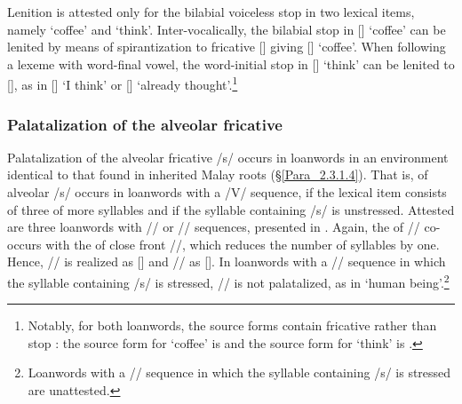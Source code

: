 Lenition is attested only for the bilabial voiceless stop in two lexical items, namely  ‘coffee’ and  ‘think’. Inter-vocalically, the bilabial stop in  [] ‘coffee’ can be lenited by means of spirantization to fricative [] giving [] ‘coffee’. When following a lexeme with word-final vowel, the word-initial stop in  [] ‘think’ can be lenited to [], as in []  ‘I think’ or []  ‘already thought’.\footnote{Notably, for both loanwords, the source forms contain fricative  rather than stop : the source form for  ‘coffee’ is   and the source form for  ‘think’ is  .}


\subsubsection[Palatalization of the alveolar fricative]{Palatalization of the alveolar fricative\label{Para_2.5.2.3}}

Palatalization of the alveolar fricative /s/ occurs in loanwords in an environment identical to that found in inherited Malay roots (§\ref{Para_2.3.1.4}). That is,  of alveolar /s/ occurs in loanwords with a /V/ sequence, if the lexical item consists of three of more syllables and if the syllable containing /s/ is unstressed. Attested are three loanwords with // or // sequences, presented in . Again, the  of // co-occurs with the  of close front //, which reduces the number of syllables by one. Hence, // is realized as [] and // as []. In loanwords with a // sequence in which the syllable containing /s/ is stressed, // is not palatalized, as in  ‘human being’.\footnote{Loanwords with a // sequence in which the syllable containing /s/ is stressed are unattested.}

